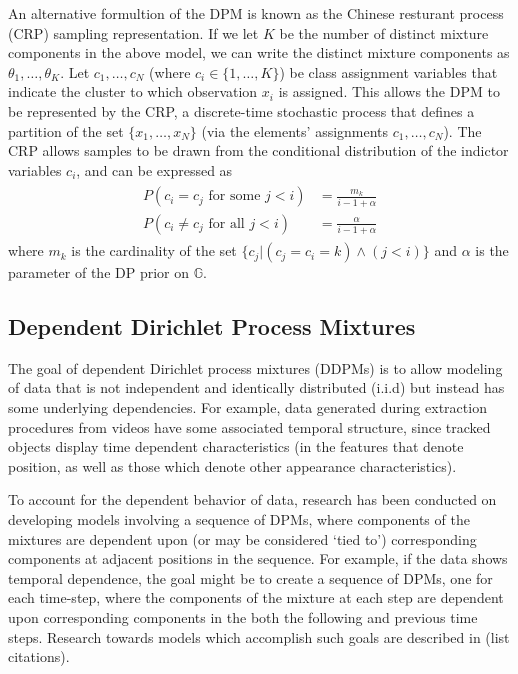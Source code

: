 \documentclass{article}
\begin{document}
An alternative formultion of the DPM is known as the Chinese resturant process (CRP) sampling representation. If we let $K$ be the number of distinct mixture components in the above model, we can write the distinct mixture components as $\theta_{1}, \ldots, \theta_{K}$. Let $c_{1}, \ldots, c_{N}$ (where $c_{i} \in \{1, \ldots, K \}$) be class assignment variables that indicate the cluster to which observation $x_{i}$ is assigned. This allows the DPM to be represented by the CRP, a discrete-time stochastic process that defines a partition of the set $\{ x_{1}, \ldots, x_{N} \}$ (via the elements' assignments $c_{1}, \ldots, c_{N}$). The CRP allows samples to be drawn from the conditional distribution of the indictor variables $c_{i}$, and can be expressed as
\begin{align}
\begin{split}
	P(c_{i} = c_{j} \text{  for some  } j<i) &= \frac{m_{k}}{i-1+\alpha}\\
	P(c_{i} \neq c_{j} \text{  for all  } j<i) &= \frac{\alpha}{i-1+\alpha}
\end{split}
\end{align}
where $m_{k}$ is the cardinality of the set $\{ c_{j} | (c_{j}=c_{i}=k)  \wedge  (j < i) \}$ and $\alpha$ is the parameter of the DP prior on $\mathbb{G}$.








\subsection{Dependent Dirichlet Process Mixtures}

The goal of dependent Dirichlet process mixtures (DDPMs) is to allow modeling of data that is not independent and identically distributed (i.i.d) but instead has some underlying dependencies. For example, data generated during extraction procedures from videos have some associated temporal structure, since tracked objects display time dependent characteristics (in the features that denote position, as well as those which denote other appearance characteristics).

To account for the dependent behavior of data, research has been conducted on developing models involving a sequence of DPMs, where components of the mixtures are dependent upon (or may be considered `tied to') corresponding components at adjacent positions in the sequence. For example, if the data shows temporal dependence, the goal might be to create a sequence of DPMs, one for each time-step, where the components of the mixture at each step are dependent upon corresponding components in the both the following and previous time steps. Research towards models which accomplish such goals are described in (list citations).
\end{document}
